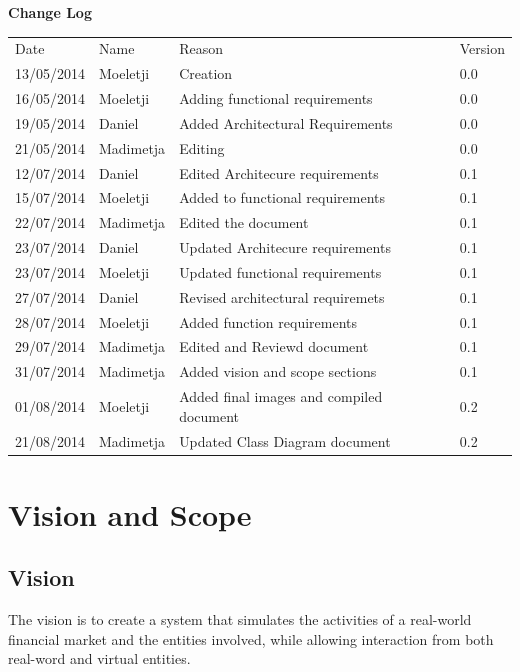 \documentclass[12pt]{article}
\begin{document}
	\newpage		
	\large 
 	{\bf Change Log}\\[1em]
	\begin{tabular}{llll}
		Date & Name & Reason & Version \\
		13/05/2014 & Moeletji & Creation & 0.0 \\
		16/05/2014 & Moeletji & Adding functional requirements & 0.0 \\
		19/05/2014 & Daniel & Added Architectural Requirements & 0.0 \\
		21/05/2014 & Madimetja & Editing & 0.0 \\
		12/07/2014 & Daniel & Edited Architecure requirements & 0.1 \\
		15/07/2014 & Moeletji & Added to functional requirements & 0.1 \\
		22/07/2014 & Madimetja & Edited the document & 0.1 \\
		23/07/2014 & Daniel & Updated Architecure requirements & 0.1\\
		23/07/2014 & Moeletji & Updated functional requirements & 0.1\\
		27/07/2014 & Daniel & Revised architectural requiremets & 0.1\\
		28/07/2014 & Moeletji & Added function requirements & 0.1\\
		29/07/2014 & Madimetja & Edited and Reviewd document & 0.1\\
		31/07/2014 & Madimetja & Added vision and scope sections & 0.1\\
		01/08/2014 & Moeletji & Added final images and compiled document & 0.2\\
		21/08/2014 & Madimetja &  Updated Class Diagram document & 0.2\\
	\end{tabular}
	
	\newpage
	\tableofcontents
				  
		\newpage
			\section{Vision and Scope}
				\subsection{Vision}
				The vision is to create a system that simulates the activities of a real-world financial market and the entities involved, while allowing interaction from both real-word and virtual entities.
				
\end{document}
